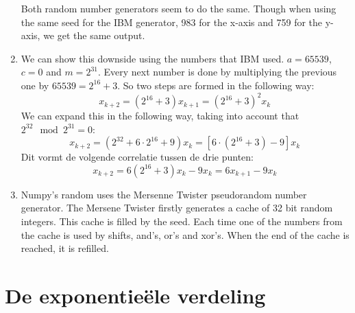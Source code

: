 \documentclass[a4paper,12px]{article}
\begin{document}
\begin{enumerate}
\begin{figure}[!h]
        \end{figure}
        \FloatBarrier
        Both random number generators seem to do the same. Though when using
        the same seed for the IBM generator, 983 for the x-axis and 759 for
        the y-axis, we get the same output.
    \item %
        We can show this downside using the numbers that IBM used. $a=65539$,
        $c=0$ and $m=2^{31}$. Every next number is done by multiplying the
        previous one by $65539=2^{16}+3$. So two steps are formed in the
        following way:
        \begin{equation}x_{k+2}=(2^{16}+3) x_{k+1}=(2^{16}+3 )^2 x_{k}\,\end{equation}
        We can expand this in the following way, taking into account that
        $2^{32}\mod2^{31}=0$:
        \begin{equation}x_{k+2}=(2^{32}+6 \cdot2^{16} +9 )x_{k}=[6 \cdot (2^{16}+3)-9]x_{k}\,\end{equation}
        Dit vormt de volgende correlatie tussen de drie punten:
        \begin{equation}x_{k+2}=6(2^{16}+3)x_{k}-9x_{k}=6x_{k+1}-9x_{k}\,\end{equation}
    \item Numpy's random uses the Mersenne Twister pseudorandom number generator. 
        The Mersene Twister firstly generates a cache of 32 bit random
        integers. This cache is filled by the seed. Each time one of the
        numbers from the cache is used by shifts, and's, or's and xor's.
        When the end of the cache is reached, it is refilled.
\end{enumerate}
\section{De exponentie\"ele verdeling}
\end{document}
